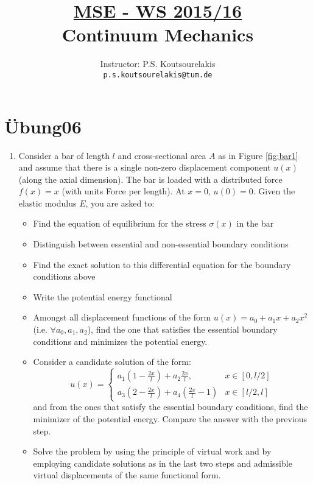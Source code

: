 \documentclass{article}
\title{\underline{MSE - WS 2015/16}\\
Continuum Mechanics}
\author{
Instructor: P.S. Koutsourelakis  \\
\texttt{p.s.koutsourelakis@tum.de} \\
}
\newcommand{\ee}{\end{equation}}
\newcommand{\be}{\begin{equation}}
\newcommand{\bi}{\begin{itemize}}
\newcommand{\ei}{\end{itemize}}
\begin{document}
\makeanontitle

%

\section*{\"Ubung06}




\begin{enumerate}

\item Consider a  bar of length $l$ and cross-sectional area $A$ as in Figure \ref{fig:bar1} and assume that there is a single non-zero displacement component
$u(x)$ (along the axial dimension).
The bar is loaded with a distributed force $f(x)=x$ (with units Force per length).  At $x=0$, $u(0)=0$.
Given the elastic modulus $E$, you are asked to:
\bi
\item Find the equation of equilibrium for the stress $\sigma(x)$ in the bar
\item Distinguish between essential and non-essential boundary conditions
\item Find the exact solution to this differential equation for the boundary conditions above
\item Write the potential energy functional
\item Amongst all displacement functions of the form $u(x)=a_0+a_1x+a_2x^2$ (i.e. $\forall a_0,a_1,a_2$), find the one that satisfies the essential boundary
conditions and minimizes the potential energy.
\item Consider a candidate solution of the form:
\be
u(x)=\left\{ \begin{array}{ll} a_1(1-\frac{2x}{l})+a_2 \frac{2x}{l}, & x\in [0,l/2] \\
                               a_3(2-\frac{2x}{l})+a_4 (\frac{2x}{l}-1)& x\in [l/2,l] 
             \end{array} \right.
\ee
and from the ones that satisfy the essential boundary conditions, find the minimizer of the potential energy. Compare the answer with the previous step.
\item Solve the problem by using the principle of virtual work and by employing candidate solutions as in the last two steps and admissible virtual
displacements of the same functional form.
\ei
\begin{figure}[th]
\hfill
{}
\end{figure}



\end{enumerate}
\end{document}
